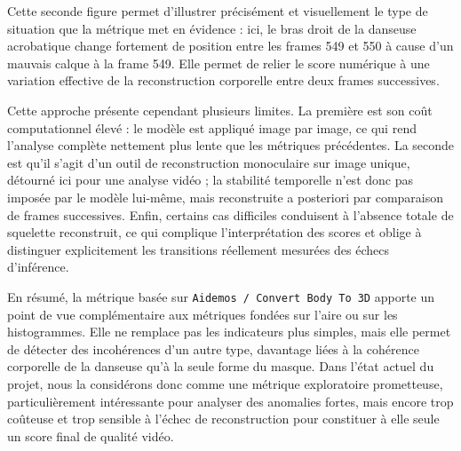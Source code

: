 \documentclass[11pt,a4paper]{article}
\begin{document}
Cette seconde figure permet d'illustrer précisément et visuellement le type de situation que la métrique met en évidence : ici, le bras droit de la danseuse acrobatique change fortement de position entre les frames 549 et 550 à cause d'un mauvais calque à la frame 549.
Elle permet de relier le score numérique à une variation effective de la reconstruction corporelle entre deux frames successives.

Cette approche présente cependant plusieurs limites. La première est son coût computationnel élevé : le modèle est appliqué image par image, ce qui rend l'analyse complète nettement plus lente que les métriques précédentes. La seconde est qu'il s'agit d'un outil de reconstruction monoculaire sur image unique, détourné ici pour une analyse vidéo ; la stabilité temporelle n'est donc pas imposée par le modèle lui-même, mais reconstruite a posteriori par comparaison de frames successives. Enfin, certains cas difficiles conduisent à l'absence totale de squelette reconstruit, ce qui complique l'interprétation des scores et oblige à distinguer explicitement les transitions réellement mesurées des échecs d'inférence.

En résumé, la métrique basée sur \texttt{Aidemos / Convert Body To 3D} apporte un point de vue complémentaire aux métriques fondées sur l'aire ou sur les histogrammes. Elle ne remplace pas les indicateurs plus simples, mais elle permet de détecter des incohérences d'un autre type, davantage liées à la cohérence corporelle de la danseuse qu'à la seule forme du masque. Dans l'état actuel du projet, nous la considérons donc comme une métrique exploratoire prometteuse, particulièrement intéressante pour analyser des anomalies fortes, mais encore trop coûteuse et trop sensible à l'échec de reconstruction pour constituer à elle seule un score final de qualité vidéo.

\newpage
\end{document}
